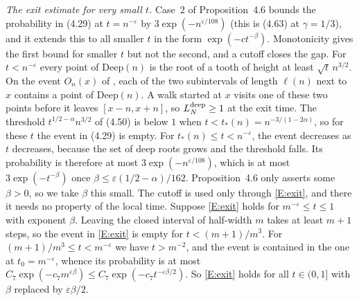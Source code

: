 \documentclass[11pt]{amsart}
\theoremstyle{remark}
\numberwithin{equation}{section}
\begin{document}
\emph{The exit estimate for very small $t$.} Case~2 of Proposition~4.6 bounds the probability in (4.29) at $t=n^{-\varepsilon}$ by $3\exp(-n^{\varepsilon/108})$ (this is (4.63) at $\gamma=1/3$), and it extends this to all smaller $t$ in the form $\exp(-ct^{-\beta})$. Monotonicity gives the first bound for smaller $t$ but not the second, and a cutoff closes the gap. For $t<n^{-\varepsilon}$ every point of $\mathrm{Deep}(n)$ is the root of a tooth of height at least $\sqrt t\,n^{3/2}$. On the event $O_n(x)$ of \cite{DNNS}, each of the two subintervals of length $\ell(n)$ next to $x$ contains a point of $\mathrm{Deep}(n)$. A walk started at $x$ visits one of these two points before it leaves $[x-n,x+n]$, so $L^{\rm deep}_N\ge1$ at the exit time. The threshold $t^{1/2-\alpha}n^{3/2}$ of (4.50) is below $1$ when $t<t_*(n)=n^{-3/(1-2\alpha)}$, so for these $t$ the event in (4.29) is empty. For $t_*(n)\le t<n^{-\varepsilon}$, the event decreases as $t$ decreases, because the set of deep roots grows and the threshold falls. Its probability is therefore at most $3\exp(-n^{\varepsilon/108})$, which is at most $3\exp(-t^{-\beta})$ once $\beta\le\varepsilon(1/2-\alpha)/162$. Proposition~4.6 only asserts some $\beta>0$, so we take $\beta$ this small. The cutoff is used only through \ref{E:exit}, and there it needs no property of the local time. Suppose \ref{E:exit} holds for $m^{-\varepsilon}\le t\le1$ with exponent $\beta$. Leaving the closed interval of half-width $m$ takes at least $m+1$ steps, so the event in \ref{E:exit} is empty for $t<(m+1)/m^3$. For $(m+1)/m^3\le t<m^{-\varepsilon}$ we have $t>m^{-2}$, and the event is contained in the one at $t_0=m^{-\varepsilon}$, whence its probability is at most $C_7\exp(-c_7m^{\varepsilon\beta})\le C_7\exp(-c_7t^{-\varepsilon\beta/2})$. So \ref{E:exit} holds for all $t\in(0,1]$ with $\beta$ replaced by $\varepsilon\beta/2$.
\end{document}
